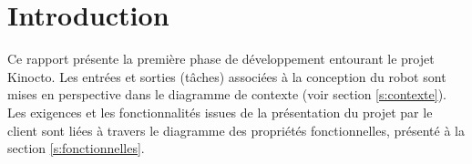 


\chapter{Introduction}
\label{s:introduction}

Ce rapport présente la première phase de développement entourant le projet Kinocto. Les entrées et sorties (tâches) associées à la conception du robot sont mises en perspective dans le diagramme de contexte (voir section \ref{s:contexte}). Les exigences et les fonctionnalités issues de la présentation du projet par le client sont liées à travers le diagramme des propriétés fonctionnelles, présenté à la section \ref{s:fonctionnelles}.
